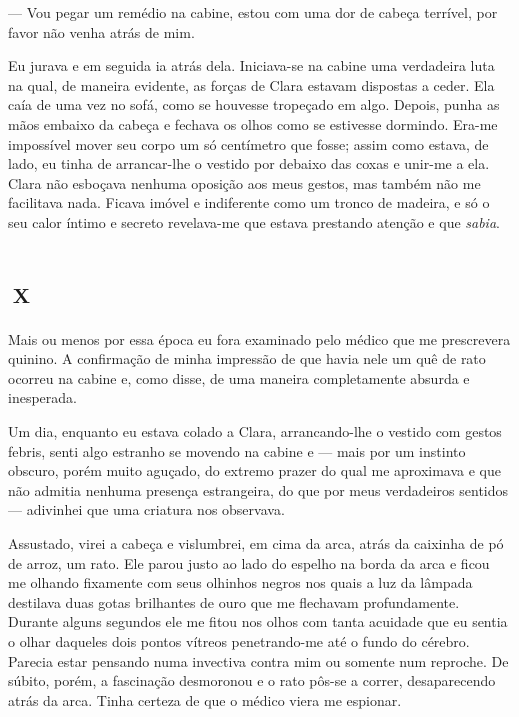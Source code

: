--- Vou pegar um remédio na cabine, estou com uma dor de cabeça terrível, por favor não venha atrás de mim.

Eu jurava e em seguida ia atrás dela. Iniciava-se na cabine uma verdadeira luta na qual, de maneira evidente, as forças de Clara estavam dispostas a ceder. Ela caía de uma vez no sofá, como se houvesse tropeçado em algo. Depois, punha as mãos embaixo da cabeça e fechava os olhos como se estivesse dormindo. Era-me impossível mover seu corpo um só centímetro que fosse; assim como estava, de lado, eu tinha de arrancar-lhe o vestido por debaixo das coxas e unir-me a ela. Clara não esboçava nenhuma oposição aos meus gestos, mas também não me facilitava nada. Ficava imóvel e indiferente como um tronco de madeira, e só o seu calor íntimo e secreto revelava-me que estava prestando atenção e que \textit{sabia}.


\chapter*{\small{}\,\Large\centering\textsc{x}\,\small{}}

Mais ou menos por essa época eu fora examinado pelo médico que me prescrevera quinino. A confirmação de minha impressão de que havia nele um quê de rato ocorreu na cabine e, como disse, de uma maneira completamente absurda e inesperada. 

Um dia, enquanto eu estava colado a Clara, arrancando-lhe o vestido com gestos febris, senti algo estranho se movendo na cabine e --- mais por um instinto obscuro, porém muito aguçado, do extremo prazer do qual me aproximava e que não admitia nenhuma presença estrangeira, do que por meus verdadeiros sentidos --- adivinhei que uma criatura nos observava.

Assustado, virei a cabeça e vislumbrei, em cima da arca, atrás da caixinha de pó de arroz, um rato. Ele parou justo ao lado do espelho na borda da arca e ficou me olhando fixamente com seus olhinhos negros nos quais a luz da lâmpada destilava duas gotas brilhantes de ouro que me flechavam profundamente. Durante alguns segundos ele me fitou nos olhos com tanta acuidade que eu sentia o olhar daqueles dois pontos vítreos penetrando-me até o fundo do cérebro. Parecia estar pensando numa invectiva contra mim ou somente num reproche. De súbito, porém, a fascinação desmoronou e o rato pôs-se a correr, desaparecendo atrás da arca. Tinha certeza de que o médico viera me espionar.

